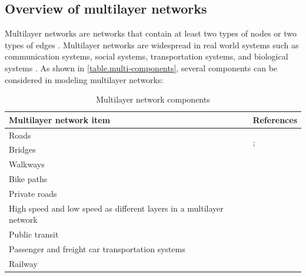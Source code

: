 \documentclass[11pt,twoside]{article}
\numberwithin{equation}{section}
\newcommand{\?}{\stackrel{?}{=}}
\begin{document}
\subsection{Overview of multilayer networks}
Multilayer networks are networks that contain at least two types of nodes or two types of edges \citep{skrlj2019py3plex}. Multilayer networks are widespread in real world systems such as communication systems, social systems, transportation systems, and biological systems \citep{wu2020traffic}.
As shown in \autoref{table.multi-components}, several  components can be considered in modeling multilayer networks:

\begin{table}[h!]
  \begin{center}
  \small
  \caption{Multilayer network components}
    \label{table.multi-components}
    \begin{tabular}{p{3in} p{2in}}\toprule
      \textbf{Multilayer network item } & \textbf{References} 
      \\\midrule
      Roads  & \multirow{2}{*}{\citet{antony2017developing}; \citet{zhang2017resiliencebased}} \\
      Bridges &                                \\
      Walkways  & \multirow{2}{*}{\citet{antony2017developing} }\\
      Bike paths  &   \\
      Private roads  &   \\
      High speed and low speed as different layers in a multilayer network & \citet{wu2020traffica} \\
      Public transit & \multirow{2}{*}{\citet{ahmed2020resilience}} \\
      Passenger and freight car transportation systems   &  \\
      Railway & \citet{bhatia2015network} \\\bottomrule
    \end{tabular}
  \end{center}
\end{table}
\end{document}
